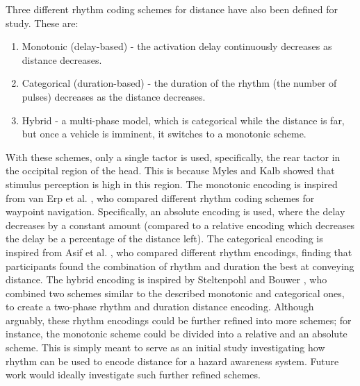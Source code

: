 \documentclass{interim}
\begin{document}
Three different rhythm coding schemes for distance have also been defined for study. These are:
\begin{enumerate}
    \item Monotonic (delay-based) - the activation delay continuously decreases as distance decreases.
    \item Categorical (duration-based) - the duration of the rhythm (the number of pulses) decreases as the distance decreases.
    \item Hybrid - a multi-phase model, which is categorical while the distance is far, but once a vehicle is imminent, it switches to a monotonic scheme.
\end{enumerate}
With these schemes, only a single tactor is used, specifically, the rear tactor in the occipital region of the head. This is because Myles and Kalb \cite{headguidelines} showed that stimulus perception is high in this region.
The monotonic encoding is inspired from van Erp et al. \cite{10.1145/1060581.1060585}, who compared different rhythm coding schemes for waypoint navigation. Specifically, an absolute encoding is used, where the delay decreases by a constant amount (compared to a relative encoding which decreases the delay be a percentage of the distance left). The categorical encoding is inspired from Asif et al. \cite{10.1145/1868914.1868923}, who compared different rhythm encodings, finding that participants found the combination of rhythm and duration the best at conveying distance. The hybrid encoding is inspired by Steltenpohl and Bouwer \cite{10.1145/2449396.2449450}, who combined two schemes similar to the described monotonic and categorical ones, to create a two-phase rhythm and duration distance encoding. Although arguably, these rhythm encodings could be further refined into more schemes; for instance, the monotonic scheme could be divided into a relative and an absolute scheme. This is simply meant to serve as an initial study investigating how rhythm can be used to encode distance for a hazard awareness system. Future work would ideally investigate such further refined schemes.
\end{document}
